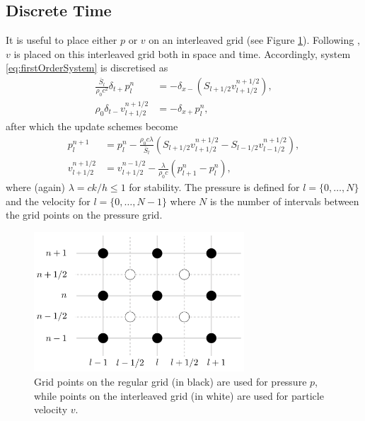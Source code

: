 {\subsection{Discrete Time}
It is useful to place either $p$ or $v$ on an interleaved grid (see Figure \ref{fig:interleavedGrid}). Following \cite{Harrison2018}, $v$ is placed on this interleaved grid both in space and time. 
Accordingly, system \eqref{eq:firstOrderSystem} is discretised as
\begin{subequations}
    \begin{align}
        \frac{\bar S_l}{\rho_0 c^2}\delta_{t+}p_l^n &= -\delta_{x-}(S_{l+1/2}v_{l+1/2}^{n+1/2}),\label{eq:discPressure}\\
        \rho_0 \delta_{t-}v_{l+1/2}^{n+1/2}&=-\delta_{x+}p_l^n,\label{eq:discVelocity}
    \end{align}
\end{subequations}
after which the update schemes become
\begin{subequations}
    \begin{align}
        p_l^{n+1} &= p_l^n - \frac{\rho_0 c \lambda}{\bar{S}_l}(S_{l+1/2}v_{l+1/2}^{n+1/2}-S_{l-1/2}v_{l-1/2}^{n+1/2}),\label{eq:pressureUpdate}\\
        v_{l+1/2}^{n+1/2} &= v_{l+1/2}^{n-1/2}-\frac{\lambda}{\rho_0 c}(p_{l+1}^n - p_l^n),\label{eq:velocityUpdate}
    \end{align}
\end{subequations}
where (again) $\lambda = ck/h \leq 1$ for stability. The pressure is defined for $l=\{0, \hdots, N\}$ and the velocity for $l=\{0, \hdots, N-1\}$ where $N$ is the number of intervals between the grid points on the pressure grid.

\begin{figure}
    \centering
    \includegraphics[width=0.7\textwidth]{figures/resonators/brass/interleavedGridFigure.pdf}
    \caption{Grid points on the regular grid (in black) are used for pressure $p$, while points on the interleaved grid (in white) are used for particle velocity $v$.\label{fig:interleavedGrid}}
\end{figure}

}
